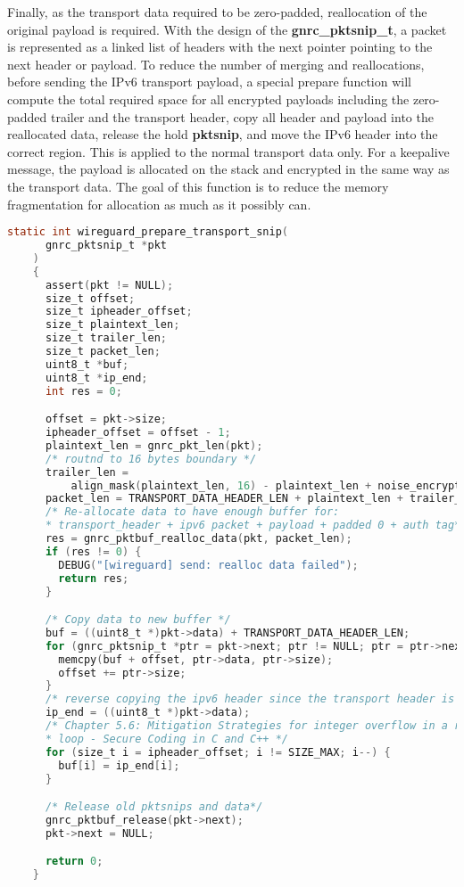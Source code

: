   Finally, as the transport data required to be zero-padded, reallocation of the original payload
  is required. With the design of the \textbf{gnrc{\_}pktsnip{\_}t}, a packet is represented as
  a linked list of headers with the next pointer pointing to the next header or payload. To reduce
  the number of merging and reallocations, before sending the IPv6 transport payload, a special
  prepare function will compute the total required space for all encrypted payloads including
  the zero-padded trailer and the transport header, copy all header and payload into
  the reallocated data, release the hold \textbf{pktsnip}, and move the IPv6 header
  into the correct region. This is applied to the normal transport data only. For a keepalive message,
  the payload is allocated on the stack and encrypted in the same way as the transport data.
  The goal of this function is to reduce the memory fragmentation for allocation as much
  as it possibly can.
  \begin{lstlisting}[caption = The flow of transport data preparation,language=C, label={lst:prep}]
    static int wireguard_prepare_transport_snip(
      gnrc_pktsnip_t *pkt
    ) 
    {
      assert(pkt != NULL);
      size_t offset;
      size_t ipheader_offset;
      size_t plaintext_len;
      size_t trailer_len;
      size_t packet_len;
      uint8_t *buf;
      uint8_t *ip_end;
      int res = 0;

      offset = pkt->size;
      ipheader_offset = offset - 1;
      plaintext_len = gnrc_pkt_len(pkt);
      /* routnd to 16 bytes boundary */
      trailer_len =
          align_mask(plaintext_len, 16) - plaintext_len + noise_encrypted_len(0);
      packet_len = TRANSPORT_DATA_HEADER_LEN + plaintext_len + trailer_len;
      /* Re-allocate data to have enough buffer for:
      * transport_header + ipv6 packet + payload + padded 0 + auth tag*/
      res = gnrc_pktbuf_realloc_data(pkt, packet_len);
      if (res != 0) {
        DEBUG("[wireguard] send: realloc data failed");
        return res;
      }

      /* Copy data to new buffer */
      buf = ((uint8_t *)pkt->data) + TRANSPORT_DATA_HEADER_LEN;
      for (gnrc_pktsnip_t *ptr = pkt->next; ptr != NULL; ptr = ptr->next) {
        memcpy(buf + offset, ptr->data, ptr->size);
        offset += ptr->size;
      }
      /* reverse copying the ipv6 header since the transport header is shorter */
      ip_end = ((uint8_t *)pkt->data);
      /* Chapter 5.6: Mitigation Strategies for integer overflow in a reverse for
      * loop - Secure Coding in C and C++ */
      for (size_t i = ipheader_offset; i != SIZE_MAX; i--) {
        buf[i] = ip_end[i];
      }

      /* Release old pktsnips and data*/
      gnrc_pktbuf_release(pkt->next);
      pkt->next = NULL;

      return 0;
    }
  \end{lstlisting}

